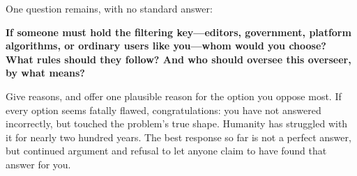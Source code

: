One question remains, with no standard answer:

\textbf{If someone must hold the filtering key---editors, government, platform algorithms, or ordinary users like you---whom would you choose? What rules should they follow? And who should oversee this overseer, by what means?}

Give reasons, and offer one plausible reason for the option you oppose most. If every option seems fatally flawed, congratulations: you have not answered incorrectly, but touched the problem's true shape. Humanity has struggled with it for nearly two hundred years. The best response so far is not a perfect answer, but continued argument and refusal to let anyone claim to have found that answer for you.
